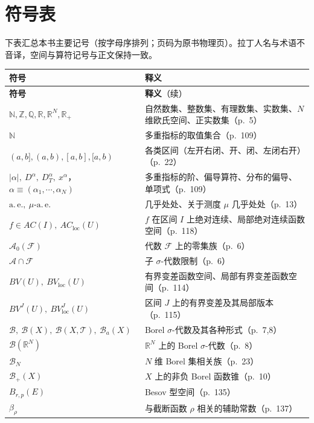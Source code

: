 \documentclass[../main.tex]{subfiles}
\begin{document}
\chapter*{符号表}\label{chapter:symbols}

下表汇总本书主要记号（按字母序排列；页码为原书物理页）。拉丁人名与术语不音译，空间与算符记号与正文保持一致。

\begin{longtable}{p{}p{}}
\hline
\textbf{符号} & \textbf{释义} \\
\hline
\endfirsthead
\hline
\textbf{符号} & \textbf{释义}（续）\\
\hline
\endhead
$\mathbb{N},\mathbb{Z},\mathbb{Q},\mathbb{R},\mathbb{R}^N,\mathbb{R}_+$ & 自然数集、整数集、有理数集、实数集、$N$ 维欧氏空间、正实数集（p.~5）\\
$\mathbb{N}$ & 多重指标的取值集合（p.~109）\\
$(a,b],(a,b),[a,b],[a,b)$ & 各类区间（左开右闭、开、闭、左闭右开）（p.~22）\\
$|\alpha|,\ D^\alpha,\ D_T^\alpha,\ x^\alpha$，$\alpha\equiv(\alpha_1,\cdots ,\alpha_N)$ & 多重指标的阶、偏导算符、分布的偏导、单项式（p.~109）\\
$\mathrm{a.\,e.},\ \mu\text{-}\mathrm{a.\,e.}$ & 几乎处处、关于测度 $\mu$ 几乎处处（p.~13）\\
$f\in AC(I),\ AC_{\mathrm{loc}}(U)$ & $f$ 在区间 $I$ 上绝对连续、局部绝对连续函数空间（p.~118）\\
$\mathcal{A}_0(\mathcal{F})$ & 代数 $\mathcal{F}$ 上的零集族（p.~6）\\
$\mathcal{A}\cap\mathcal{F}$ & 子 $\sigma$-代数限制（p.~6）\\
$BV(U),\ BV_{\mathrm{loc}}(U)$ & 有界变差函数空间、局部有界变差函数空间（p.~114）\\
$BV^J(U),\ BV^J_{\mathrm{loc}}(U)$ & 区间 $J$ 上的有界变差及其局部版本（p.~115）\\
$\mathcal{B},\ \mathcal{B}(X),\ \mathcal{B}(X,\mathcal{T}),\ \mathcal{B}_a(X)$ & Borel $\sigma$-代数及其各种形式（p.~7,8）\\
$\mathcal{B}(\mathbb{R}^N)$ & $\mathbb{R}^N$ 上的 Borel $\sigma$-代数（p.~8）\\
$\mathcal{B}_N$ & $N$ 维 Borel 集相关族（p.~23）\\
$\mathcal{B}_+(X)$ & $X$ 上的非负 Borel 函数锥（p.~10）\\
$B_{r,p}(E)$ & Besov 型空间（p.~135）\\
$\beta_\rho$ & 与截断函数 $\rho$ 相关的辅助常数（p.~137）\\

\end{longtable}
\end{document}

